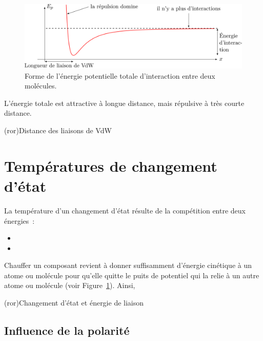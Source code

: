 \documentclass[../../main/main.tex]{subfiles}
\begin{document}
\begin{figure}[h!]
	\centering
	\includegraphics[scale=1]{eprep}
	\caption{Forme de l'énergie potentielle totale d'interaction entre deux
		molécules.}
	\label{fig:eprep}
\end{figure}
L'énergie totale est attractive à longue distance, mais répulsive à très courte
distance.
\begin{tcb*}[cnt](ror){Distance des liaisons de VdW}
\end{tcb*}

\section{Températures de changement d'état}
La température d'un changement d'état résulte de la compétition entre deux
énergies~:
\begin{itemize}
	\item {}
	\item {}
\end{itemize}
Chauffer un composant revient à donner suffisamment d'énergie cinétique à un
atome ou molécule pour qu'elle quitte le puits de potentiel qui la relie à un
autre atome ou molécule (voir Figure~\ref{fig:eprep}). Ainsi,
\begin{tcb*}(ror){Changement d'état et énergie de liaison}
\end{tcb*}

\subsection{Influence de la polarité}
\end{document}
